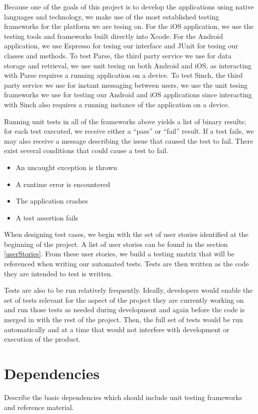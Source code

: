 Because one of the goals of this project is to develop the applications using
native languages and technology, we make use of the most established testing
frameworks for the platform we are tesing on. For the iOS application, we use
the testing tools and frameworks built directly into Xcode. For the Android
application, we use Espresso for tesing our interface and JUnit for tesing our
classes and methods. To test Parse, the third party service we use for data
storage and retrieval, we use unit tesing on both Android and iOS, as
interacting with Parse requires a running application on a device. To test
Sinch, the third party service we use for instant messaging between users, we
use the unit tesing frameworks we use for testing our Android and iOS
applications since interacting with Sinch also requires a running instance of
the application on a device.

Running unit tests in all of the frameworks above yields a list of binary
results; for each test executed, we receive either a ``pass'' or ``fail''
result. If a test fails, we may also receive a message describing the issue
that caused the test to fail. There exist several conditions that could cause
a test to fail.

\begin{itemize}
	\item An uncaught exception is thrown
	\item A runtime error is encountered
	\item The application crashes
	\item A test assertion fails
\end{itemize}

When designing test cases, we begin with the set of user stories identified at
the beginning of the project. A list of user stories can be found in the section
\ref{userStories}. From these user stories, we build a testing matrix that will
be referenced when writing our automated tests. Tests are then written as the
code they are intended to test is written.

Tests are also to be run relatively frequently. Ideally, developers would enable
the set of tests relevant for the aspect of the project they are currently
working on and run those tests as needed during development and again before the
code is merged in with the rest of the project. Then, the full set of tests
would be run automatically and at a time that would not interfere with
development or execution of the product.


\section{Dependencies}
Describe the basic dependencies which should include unit testing frameworks and 
reference material. 


